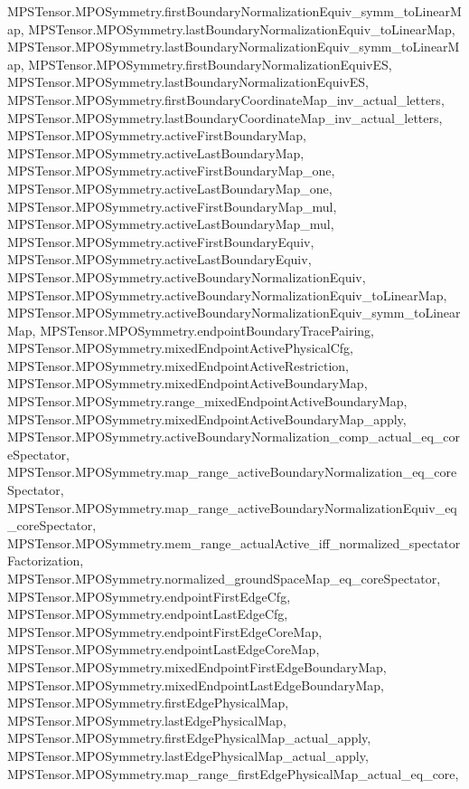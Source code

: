 \begin{lemma}
{        MPSTensor.MPOSymmetry.firstBoundaryNormalizationEquiv_symm_toLinearMap,
        MPSTensor.MPOSymmetry.lastBoundaryNormalizationEquiv_toLinearMap,
        MPSTensor.MPOSymmetry.lastBoundaryNormalizationEquiv_symm_toLinearMap,
        MPSTensor.MPOSymmetry.firstBoundaryNormalizationEquivES,
        MPSTensor.MPOSymmetry.lastBoundaryNormalizationEquivES,
        MPSTensor.MPOSymmetry.firstBoundaryCoordinateMap_inv_actual_letters,
        MPSTensor.MPOSymmetry.lastBoundaryCoordinateMap_inv_actual_letters,
        MPSTensor.MPOSymmetry.activeFirstBoundaryMap,
        MPSTensor.MPOSymmetry.activeLastBoundaryMap,
        MPSTensor.MPOSymmetry.activeFirstBoundaryMap_one,
        MPSTensor.MPOSymmetry.activeLastBoundaryMap_one,
        MPSTensor.MPOSymmetry.activeFirstBoundaryMap_mul,
        MPSTensor.MPOSymmetry.activeLastBoundaryMap_mul,
        MPSTensor.MPOSymmetry.activeFirstBoundaryEquiv,
        MPSTensor.MPOSymmetry.activeLastBoundaryEquiv,
        MPSTensor.MPOSymmetry.activeBoundaryNormalizationEquiv,
        MPSTensor.MPOSymmetry.activeBoundaryNormalizationEquiv_toLinearMap,
        MPSTensor.MPOSymmetry.activeBoundaryNormalizationEquiv_symm_toLinearMap,
        MPSTensor.MPOSymmetry.endpointBoundaryTracePairing,
        MPSTensor.MPOSymmetry.mixedEndpointActivePhysicalCfg,
        MPSTensor.MPOSymmetry.mixedEndpointActiveRestriction,
        MPSTensor.MPOSymmetry.mixedEndpointActiveBoundaryMap,
        MPSTensor.MPOSymmetry.range_mixedEndpointActiveBoundaryMap,
        MPSTensor.MPOSymmetry.mixedEndpointActiveBoundaryMap_apply,
        MPSTensor.MPOSymmetry.activeBoundaryNormalization_comp_actual_eq_coreSpectator,
        MPSTensor.MPOSymmetry.map_range_activeBoundaryNormalization_eq_coreSpectator,
        MPSTensor.MPOSymmetry.map_range_activeBoundaryNormalizationEquiv_eq_coreSpectator,
        MPSTensor.MPOSymmetry.mem_range_actualActive_iff_normalized_spectatorFactorization,
        MPSTensor.MPOSymmetry.normalized_groundSpaceMap_eq_coreSpectator,
        MPSTensor.MPOSymmetry.endpointFirstEdgeCfg,
        MPSTensor.MPOSymmetry.endpointLastEdgeCfg,
        MPSTensor.MPOSymmetry.endpointFirstEdgeCoreMap,
        MPSTensor.MPOSymmetry.endpointLastEdgeCoreMap,
        MPSTensor.MPOSymmetry.mixedEndpointFirstEdgeBoundaryMap,
        MPSTensor.MPOSymmetry.mixedEndpointLastEdgeBoundaryMap,
        MPSTensor.MPOSymmetry.firstEdgePhysicalMap,
        MPSTensor.MPOSymmetry.lastEdgePhysicalMap,
        MPSTensor.MPOSymmetry.firstEdgePhysicalMap_actual_apply,
        MPSTensor.MPOSymmetry.lastEdgePhysicalMap_actual_apply,
        MPSTensor.MPOSymmetry.map_range_firstEdgePhysicalMap_actual_eq_core,
}
\end{lemma}
